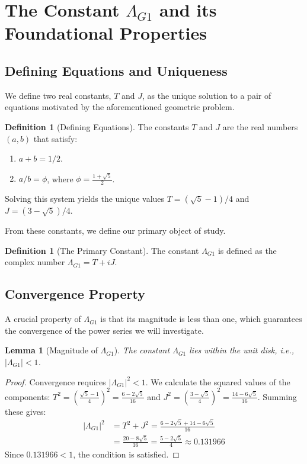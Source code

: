 \documentclass{amsart}
\theoremstyle{plain}
\newtheorem{lemma}[theorem]{Lemma}
\theoremstyle{definition}
\newtheorem{definition}[theorem]{Definition}
\theoremstyle{remark}
\newcommand{\LambdaG}{\Lambda_{G1}}
\begin{document}
\section{The Constant \texorpdfstring{$\Lambda_{G1}$}{Lambda\_G1} and its Foundational Properties}

\subsection{Defining Equations and Uniqueness}
We define two real constants, $T$ and $J$, as the unique solution to a pair of equations motivated by the aforementioned geometric problem.

\begin{definition}[Defining Equations]
The constants $T$ and $J$ are the real numbers $(a,b)$ that satisfy:
\begin{enumerate}
    \item $a+b = 1/2$.
    \item $a/b = \phi$, where $\phi = \frac{1+\sqrt{5}}{2}$.
\end{enumerate}
Solving this system yields the unique values $T = (\sqrt{5}-1)/4$ and $J = (3-\sqrt{5})/4$.
\end{definition}

From these constants, we define our primary object of study.
\begin{definition}[The Primary Constant]
The constant $\LambdaG$ is defined as the complex number $\LambdaG = T+iJ$.
\end{definition}

\subsection{Convergence Property}
A crucial property of $\LambdaG$ is that its magnitude is less than one, which guarantees the convergence of the power series we will investigate.

\begin{lemma}[Magnitude of $\LambdaG$]
\label{lem:convergence}
The constant $\LambdaG$ lies within the unit disk, i.e., $|\LambdaG| < 1$.
\end{lemma}
\begin{proof}
Convergence requires $|\LambdaG|^2 < 1$. We calculate the squared values of the components:
$T^2 = \left(\frac{\sqrt{5}-1}{4}\right)^2 = \frac{6-2\sqrt{5}}{16}$ and $J^2 = \left(\frac{3-\sqrt{5}}{4}\right)^2 = \frac{14-6\sqrt{5}}{16}$.
Summing these gives:
\begin{align*}
    |\LambdaG|^2 &= T^2+J^2 = \frac{6-2\sqrt{5} + 14-6\sqrt{5}}{16} \\
                 &= \frac{20-8\sqrt{5}}{16} = \frac{5-2\sqrt{5}}{4} \approx 0.131966
\end{align*}
Since $0.131966 < 1$, the condition is satisfied.
\end{proof}
\end{document}
